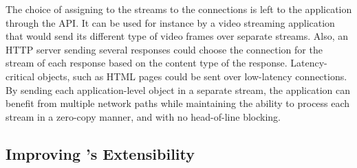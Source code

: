 The choice of assigning to the \tcpls streams to the \tcp connections is left to
the application through the \tcpls API. It can be used for instance by a video
streaming application that would send its different type of video frames over
separate streams.  Also, an HTTP server sending several responses could choose
the \tcp connection for the stream of each response based on the content type of
the response. Latency-critical objects, such as HTML pages could be sent over
low-latency connections.  By sending each application-level object in a separate
stream, the application can benefit from multiple network paths while
maintaining the ability to process each stream in a zero-copy manner, and
with no head-of-line blocking.


\subsection{Improving \tcp's Extensibility}

